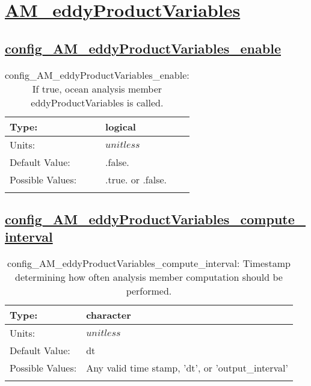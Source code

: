 \section[AM\_eddyProductVariables]{\hyperref[sec:nm_tab_AM_eddyProductVariables]{AM\_eddyProductVariables}}
\label{sec:nm_sec_AM_eddyProductVariables}
\subsection[config\_AM\_eddyProductVariables\_enable]{\hyperref[sec:nm_tab_AM_eddyProductVariables]{config\_AM\_eddyProductVariables\_enable}}
\label{subsec:nm_sec_config_AM_eddyProductVariables_enable}
\begin{center}
\begin{longtable}{| p{2.0in} || p{4.0in} |}
    \hline
    Type: & logical \\
    \hline
    Units: & $unitless$ \\
    \hline
    Default Value: & .false. \\
    \hline
    Possible Values: & .true. or .false. \\
    \hline
    \caption{config\_AM\_eddyProductVariables\_enable: If true, ocean analysis member eddyProductVariables is called.}
\end{longtable}
\end{center}
\subsection[config\_AM\_eddyProductVariables\_compute\_interval]{\hyperref[sec:nm_tab_AM_eddyProductVariables]{config\_AM\_eddyProductVariables\_compute\_interval}}
\label{subsec:nm_sec_config_AM_eddyProductVariables_compute_interval}
\begin{center}
\begin{longtable}{| p{2.0in} || p{4.0in} |}
    \hline
    Type: & character \\
    \hline
    Units: & $unitless$ \\
    \hline
    Default Value: & dt \\
    \hline
    Possible Values: & Any valid time stamp, 'dt', or 'output\_interval' \\
    \hline
    \caption{config\_AM\_eddyProductVariables\_compute\_interval: Timestamp determining how often analysis member computation should be performed.}
\end{longtable}
\end{center}
